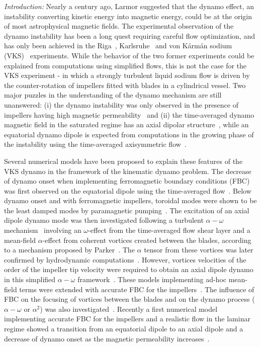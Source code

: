 \documentclass[aps,prl,twocolumn,showpacs,amsmath,amssymb]{revtex4-1}%
\begin{document}
\textit{Introduction: }\label{sec:intro}
Nearly a century ago, Larmor suggested that the dynamo effect, an instability converting kinetic energy into magnetic energy, could be at the origin of most astrophysical magnetic fields. The experimental observation of the dynamo instability has been a long quest requiring careful flow optimization, and has only been achieved in the Riga~\cite{gailitis2001}, Karlsruhe~\cite{stieglitz2001} and von K\'arm\'an sodium (VKS)~\cite{paper:monchaux:2007} experiments. While the behavior of the two former experiments could be explained from computations using simplified flows, this is not the case for the VKS experiment - in which a strongly turbulent liquid sodium flow is driven by the counter-rotation of impellers fitted with blades in a cylindrical vessel. Two major puzzles in the understanding of the dynamo mechanism are still unanswered: (i) the dynamo instability was only observed in the presence of impellers having high magnetic permeability~\cite{paper:miralles:2013} and (ii) the time-averaged dynamo magnetic field in the saturated regime  has an axial dipolar structure~\cite{paper:boisson:2012}, while an equatorial dynamo dipole is expected from computations in the growing phase of the instability  using the time-averaged axisymmetric flow~\cite{paper:ravelet:2005}. 





Several numerical models have been proposed to explain these features of the VKS dynamo in the framework of the kinematic dynamo problem. The decrease of dynamo onset when implementing ferromagnetic boundary conditions (FBC) was first observed on the equatorial dipole using the time-averaged flow~\cite{paper:gissinger:2008.1,paper:giesecke:2012}. Below dynamo onset and with ferromagnetic impellers, toroidal modes were shown to be the least damped modes by paramagnetic pumping~\cite{paper:giesecke:2012}. The excitation of an axial dipole dynamo mode was then investigated following a turbulent $\alpha-\omega$ mechanism~\cite{paper:petrelis:2007} involving an $\omega$-effect from the time-averaged flow shear layer and a mean-field $\alpha$-effect from coherent vortices created between the blades, according to a mechanism proposed by Parker~\cite{paper:Parker:1955}. The $\alpha$ tensor from these vortices was  later confirmed by hydrodynamic computations~\cite{paper:ravelet:2012}. However, vortices velocities  of the order of the impeller tip velocity were required to obtain an axial dipole dynamo in this simplified $\alpha-\omega$ framework~\cite{paper:laguerre:2008,paper:laguerre:2008erratum,paper:gissinger:2009}. These models implementing ad-hoc mean-field terms were extended with accurate FBC for the impellers~\cite{paper:giesecke:2010,paper:nore:2015}. The influence of FBC on the focusing of vortices between the blades and on the dynamo process ($\alpha-\omega$ or $\alpha^2$) was also investigated~\cite{paper:varela:2015,paper:varela:2017}. Recently a first numerical model implementing accurate FBC for the impellers and a realistic flow in the laminar regime showed a transition from an equatorial dipole to an axial dipole and a decrease of dynamo onset as the magnetic permeability increases~\cite{nore_direct_2016}.
\end{document}
